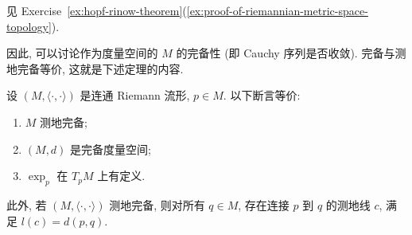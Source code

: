 \begin{RiemannProof}
见 Exercise~\ref{ex:hopf-rinow-theorem}(\ref{ex:proof-of-riemannian-metric-space-topology}).
\end{RiemannProof}

因此, 可以讨论作为度量空间的 $M$ 的完备性 (即 Cauchy 序列是否收敛). 完备与测地完备等价, 这就是下述定理的内容.

\begin{RiemannTheorem}\label{thm:hopf-rinow}
设 $(M,\langle\cdot,\cdot\rangle)$ 是连通 Riemann 流形, $p\in M$. 以下断言等价:
\begin{enumerate}[label=(\roman*),ref=\roman*,leftmargin=*]
\item\label{thm:hopf-rinow-geodesically-complete} $M$ 测地完备;
\item\label{thm:hopf-rinow-metrically-complete} $(M,d)$ 是完备度量空间;
\item\label{thm:hopf-rinow-exponential-at-one-point} $\exp_p$ 在 $T_pM$ 上有定义.
\end{enumerate}
此外, 若 $(M,\langle\cdot,\cdot\rangle)$ 测地完备, 则对所有 $q\in M$, 存在连接 $p$ 到 $q$ 的测地线 $c$, 满足 $l(c)=d(p,q)$.
\end{RiemannTheorem}

